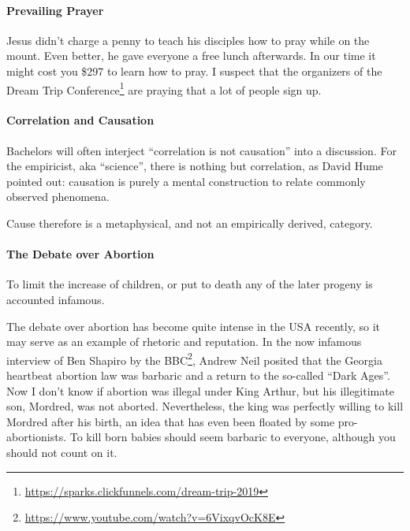 \paragraph{Prevailing Prayer}


Jesus didn't charge a penny to teach his disciples how to pray while on the mount. Even better, he gave everyone a free lunch afterwards. In our time it might cost you \$297 to learn how to pray. I suspect that the organizers of the Dream Trip Conference\footnote{\url{https://sparks.clickfunnels.com/dream-trip-2019}} are praying that a lot of people sign up.

\paragraph{Correlation and Causation}


Bachelors will often interject ``correlation is not causation'' into a discussion. For the empiricist, aka ``science'', there is nothing but correlation, as David Hume pointed out: causation is purely a mental construction to relate commonly observed phenomena.

Cause therefore is a metaphysical, and not an empirically derived, category.

\paragraph{The Debate over Abortion}


\begin{quotex}
To limit the increase of children, or put to death any of the later progeny is accounted infamous.
\end{quotex}


The debate over abortion has become quite intense in the USA recently, so it may serve as an example of rhetoric and reputation. In the now infamous interview of Ben Shapiro by the BBC\footnote{\url{https://www.youtube.com/watch?v=6VixqvOcK8E}}, Andrew Neil posited that the Georgia heartbeat abortion law was barbaric and a return to the so-called ``Dark Ages''. Now I don't know if abortion was illegal under King Arthur, but his illegitimate son, Mordred, was not aborted. Nevertheless, the king was perfectly willing to kill Mordred after his birth, an idea that has even been floated by some pro-abortionists. To kill born babies should seem barbaric to everyone, although you should not count on it.

